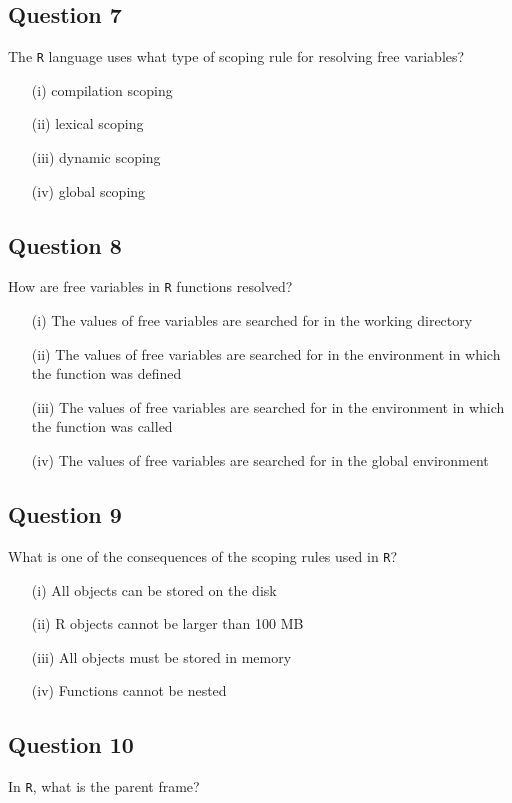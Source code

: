 \documentclass[]{article}
\begin{document}
\subsection*{Question 7}
The \texttt{R} language uses what type of scoping rule for resolving free variables?

\begin{itemize}
	\item[(i)] compilation scoping
	\item[(ii)] lexical scoping
	\item[(iii)] dynamic scoping
	\item[(iv)]global scoping
\end{itemize}
\newpage
\subsection*{Question 8}
How are free variables in \texttt{R} functions resolved?

\begin{itemize}
\item[(i)] The values of free variables are searched for in the working directory
\item[(ii)] The values of free variables are searched for in the environment in which the function was defined
\item[(iii)] The values of free variables are searched for in the environment in which the function was called
\item[(iv)] The values of free variables are searched for in the global environment
\end{itemize}
\newpage
\subsection*{Question 9}
What is one of the consequences of the scoping rules used in \texttt{R}?
\begin{itemize}
\item[(i)]
All objects can be stored on the disk
\item[(ii)] R objects cannot be larger than 100 MB
\item[(iii)] All objects must be stored in memory
\item[(iv)] Functions cannot be nested
\end{itemize}
\newpage
\subsection*{Question 10}
In \texttt{R}, what is the parent frame?
\end{document}

